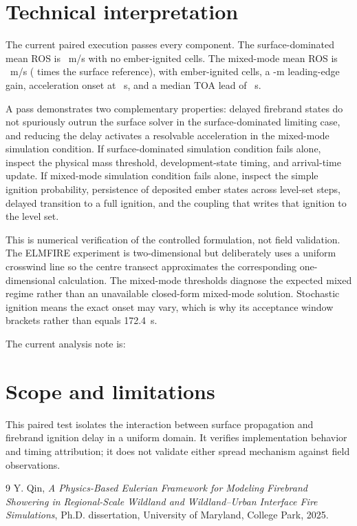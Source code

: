 \section{Technical interpretation}

The current paired execution passes every component. The surface-dominated mean ROS is ~m/s with no ember-ignited cells. The mixed-mode mean ROS is ~m/s ( times the surface reference), with  ember-ignited cells, a -m leading-edge gain, acceleration onset at ~s, and a median TOA lead of ~s.

A pass demonstrates two complementary properties: delayed firebrand states do
not spuriously outrun the surface solver in the surface-dominated limiting
case, and reducing the delay activates a resolvable acceleration in the
mixed-mode simulation condition.
If surface-dominated simulation condition fails alone, inspect the physical mass threshold, development-state
timing, and arrival-time update. If mixed-mode simulation condition fails alone, inspect the simple
ignition probability, persistence of deposited ember states across level-set
steps, delayed transition to a full ignition, and the coupling that writes
that ignition to the level set.

This is numerical verification of the controlled formulation, not field validation.
The ELMFIRE experiment is two-dimensional but deliberately uses a
uniform crosswind line so the centre transect approximates the corresponding
one-dimensional calculation. The mixed-mode thresholds diagnose the expected
mixed regime rather than an unavailable closed-form mixed-mode solution.
Stochastic ignition means the exact onset may vary, which is why its
acceptance window brackets rather than equals \SI{172.4}{\second}.

The current analysis note is: 

\section{Scope and limitations}
This paired test isolates the interaction between surface propagation and firebrand ignition delay in a uniform domain. It verifies implementation behavior and timing attribution; it does not validate either spread mechanism against field observations.

\begin{thebibliography}{9}
Y. Qin, \emph{A Physics-Based Eulerian Framework for Modeling Firebrand
Showering in Regional-Scale Wildland and Wildland--Urban Interface Fire
Simulations}, Ph.D. dissertation, University of Maryland, College Park, 2025.
\end{thebibliography}
